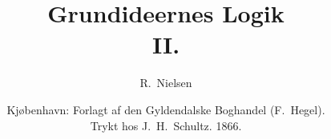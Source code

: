 \documentclass[12pt]{book}
\title{\textbf{Grundideernes Logik}\\[4pt]\large II.}
\author{R.\ Nielsen}
\date{Kjøbenhavn: Forlagt af den Gyldendalske Boghandel (F.\ Hegel).\\[2pt]
  \small Trykt hos J.\ H.\ Schultz. 1866.}
\begin{document}
\maketitle
\tableofcontents

%

\newcommand{\tocentry}[3]{\par\noindent\hangindent=\dimexpr#1em+2.2em\relax\hangafter=1\hspace*{#1em}#2\dotfill\ #3\par}

\end{document}
